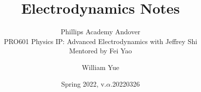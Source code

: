 \documentclass[11pt, oneside]{scrbook}
\begin{document}
\title{Electrodynamics Notes}
\subtitle{Phillips Academy Andover\\
PRO601 Physics IP: Advanced Electrodynamics with Jeffrey Shi\\
Mentored by Fei Yao}
\author{William Yue}
\date{Spring 2022, v.$\alpha$.20220326}
\maketitle



\end{document}
